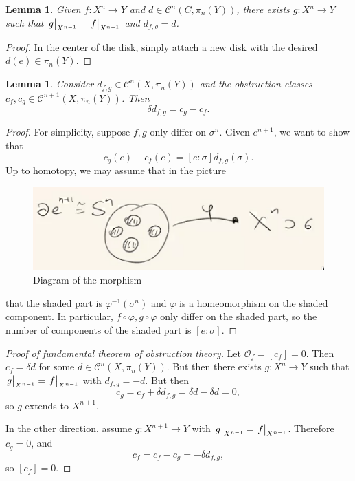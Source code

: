 \documentclass[leqno, openany]{memoir}
\newtheorem{lem}[thm]{Lemma}
\theoremstyle{definition}
\theoremstyle{remark}
\theoremstyle{plain}
\theoremstyle{definition}
\theoremstyle{remark}
\newcommand{\mc}[1]{\mathcal{#1}}
\begin{document}
\begin{lem}
    Given $f \colon X^n \to Y$ and $d \in \mc{C}^n (C, \pi_n(Y))$, there exists $g \colon X^n \to Y$ such that $\eval{g}_{X^{n-1}} = \eval{f}_{X^{n-1}}$ and $d_{f,g} = d$.
\end{lem}

\begin{proof}
    In the center of the disk, simply attach a new disk with the desired $d(e) \in \pi_n(Y)$.
\end{proof}

\begin{lem}
    Consider $d_{f,g} \in \mc{C}^n(X, \pi_n(Y))$ and the obstruction classes $c_f, c_g \in \mc{C}^{n+1}(X, \pi_n(Y))$. Then
    \[ \delta d_{f,g} = c_g - c_f. \]
\end{lem}

\begin{proof}
    For simplicity, suppose $f, g$ only differ on $\sigma^n$. Given $e^{n+1}$, we want to show that
    \[ c_g(e) - c_f(e) = [e:\sigma] d_{f,g}(\sigma). \]
    Up to homotopy, we may assume that in the picture
    \begin{figure}[H]
        \centering
        \includegraphics[width=0.8\linewidth]{shaded.png}
        \caption{Diagram of the morphism}%
        \label{fig:shaded}
    \end{figure}
    that the shaded part is $\varphi^{-1}(\sigma^n)$ and $\varphi$ is a homeomorphism on the shaded component. In particular, $f \circ \varphi, g \circ \varphi$ only differ on the shaded part, so the number of components of the shaded part is $[e:\sigma]$.
\end{proof}

\begin{proof}[Proof of fundamental theorem of obstruction theory]
    Let $\mc{O}_f = [c_f] = 0$. Then $c_f = \delta d$ for some $d \in \mc{C}^n(X, \pi_n(Y))$. But then there exists $g \colon X^n \to Y$ such that $\eval{g}_{X^{n-1}} = \eval{f}_{X^{n-1}}$ with $d_{f,g} = -d$. But then 
    \[ c_g = c_f + \delta d_{f,g} = \delta d - \delta d = 0, \]
    so $g$ extends to $X^{n+1}$.

    In the other direction, assume $g \colon X^{n+1} \to Y$ with $\eval{g}_{X^{n-1}} = \eval{f}_{X^{n-1}}$. Therefore $c_g = 0$, and
    \[ c_f = c_f - c_g = - \delta d_{f,g}, \]
    so $[c_f] = 0$.
\end{proof}
\end{document}

